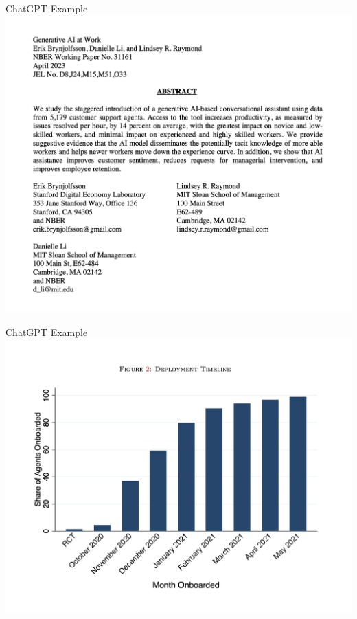 \documentclass{beamer}
\begin{document}
\begin{frame}{ChatGPT Example}
             \includegraphics[scale=0.3]{./lecture_includes/chatgpt_title}

\end{frame}

\begin{frame}{ChatGPT Example}
             \includegraphics[scale=0.3]{./lecture_includes/chatgt_rollout}

\end{frame}
\end{document}
